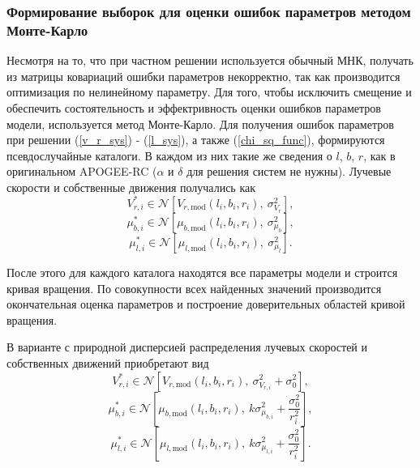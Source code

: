 \documentclass{matmex-diploma-custom}
\begin{document}
\subsubsection{Формирование выборок для оценки ошибок параметров методом \\ Монте-Карло} \label{mk}
Несмотря на то, что при частном решении используется обычный МНК, получать из матрицы ковариаций ошибки параметров некорректно, так как производится оптимизация по нелинейному параметру. Для того, чтобы исключить смещение и обеспечить состоятельность и эффектривность оценки ошибков параметров модели, используется метод Монте-Карло. Для получения ошибок параметров при решении (\ref{v_r_sys}) - (\ref{l_sys}), а также (\ref{chi_sq_func}), формируются псевдослучайные каталоги. В каждом из них такие же сведения о $l$, $b$, $r$, как в оригинальном APOGEE-RC ($\alpha$ и $\delta$ для решения систем не нужны). Лучевые скорости и собственные движения получались как
\begin{equation}
        V_{r, i}^{*} \in \mathcal{N} \left[ V_{r, \mathrm{mod}}(l_i, b_i, r_i), ~\sigma^2_{V_r} \right],
\end{equation}
\begin{equation}
        \mu_{b, i}^{*} \in \mathcal{N} \left[ \mu_{b, \mathrm{mod}}(l_i, b_i, r_i), ~\sigma^2_{\mu_b} \right],
\end{equation}
\begin{equation}
        \mu_{l, i}^{*} \in \mathcal{N} \left[ \mu_{l, \mathrm{mod}}(l_i, b_i, r_i), ~\sigma^2_{\mu_l} \right].
\end{equation}
\par После этого для каждого каталога находятся все параметры модели и строится кривая вращения. По совокупности всех найденных значений производится окончательная оценка параметров и построение доверительных областей кривой вращения.

\pagebreak
\par В варианте с природной дисперсией распределения лучевых скоростей и собственных движений приобретают вид
\begin{equation}
        V_{r, i}^{*} \in \mathcal{N} \left[ V_{r, \mathrm{mod}}(l_i, b_i, r_i),  ~\sigma^2_{V_{r, i}} + \sigma^2_0\right],
\end{equation}
\begin{equation}
        \mu_{b, i}^{*} \in \mathcal{N} \left[ \mu_{b, \mathrm{mod}}(l_i, b_i, r_i),  ~k \sigma^2_{\mu_{b, i}} + \frac{\sigma_0^2}{r^2_i} \right],
\end{equation}
\begin{equation}
        \mu_{l, i}^{*} \in \mathcal{N} \left[ \mu_{l, \mathrm{mod}}(l_i, b_i, r_i), ~k \sigma^2_{\mu_{l, i}} + \frac{\sigma_0^2}{r^2_i} \right].
\end{equation}
\end{document}
